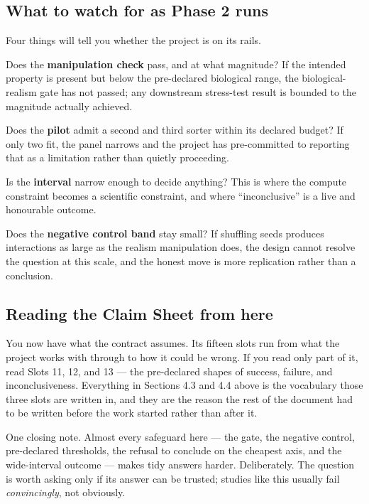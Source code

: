\documentclass[12pt]{article}
\begin{document}
\subsection{What to watch for as Phase 2 runs}

Four things will tell you whether the project is on its rails.

Does the \textbf{manipulation check} pass, and at what magnitude? If the intended property is
present but below the pre-declared biological range, the biological-realism gate has not
passed; any downstream stress-test result is bounded to the magnitude actually achieved.

Does the \textbf{pilot} admit a second and third sorter within its declared budget? If only two
fit, the panel narrows and the project has pre-committed to reporting that as a limitation
rather than quietly proceeding.

Is the \textbf{interval} narrow enough to decide anything? This is where the compute constraint
becomes a scientific constraint, and where ``inconclusive'' is a live and honourable outcome.

Does the \textbf{negative control band} stay small? If shuffling seeds produces interactions as
large as the realism manipulation does, the design cannot resolve the question at this scale,
and the honest move is more replication rather than a conclusion.

\subsection{Reading the Claim Sheet from here}

You now have what the contract assumes. Its fifteen slots run from what the project works with
through to how it could be wrong. If you read only part of it, read Slots 11, 12, and 13 --- the
pre-declared shapes of success, failure, and inconclusiveness. Everything in Sections 4.3 and
4.4 above is the vocabulary those three slots are written in, and they are the reason the rest
of the document had to be written before the work started rather than after it.

\enlargethispage{2\baselineskip}
One closing note. Almost every safeguard here --- the gate, the negative control, pre-declared
thresholds, the refusal to conclude on the cheapest axis, and the wide-interval outcome ---
makes tidy answers harder. Deliberately. The question is worth asking only if its answer can
be trusted; studies like this usually fail \emph{convincingly}, not obviously.
\end{document}
